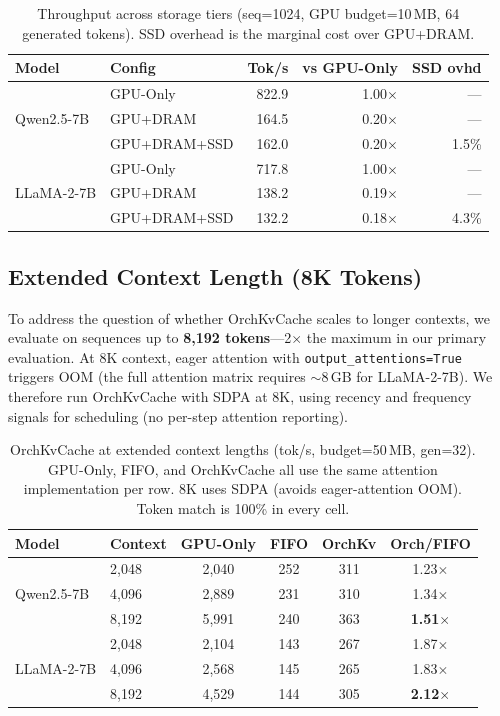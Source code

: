 \documentclass[conference]{IEEEtran}
\begin{document}
\begin{table}[t]
\centering
\caption{Throughput across storage tiers (seq=1024, GPU budget=10\,MB, 64 generated tokens). SSD overhead is the marginal cost over GPU+DRAM.}
\label{tab:tier-throughput}
\footnotesize
\setlength{\tabcolsep}{6pt}
\begin{tabular}{@{}llrrr@{}}
\toprule
Model & Config & Tok/s & vs GPU-Only & SSD ovhd \\
\midrule
\multirow{3}{*}{Qwen2.5-7B}
  & GPU-Only     & 822.9 & 1.00$\times$ & --- \\
  & GPU+DRAM     & 164.5 & 0.20$\times$ & --- \\
  & GPU+DRAM+SSD & 162.0 & 0.20$\times$ & 1.5\% \\
\midrule
\multirow{3}{*}{LLaMA-2-7B}
  & GPU-Only     & 717.8 & 1.00$\times$ & --- \\
  & GPU+DRAM     & 138.2 & 0.19$\times$ & --- \\
  & GPU+DRAM+SSD & 132.2 & 0.18$\times$ & 4.3\% \\
\bottomrule
\end{tabular}
\end{table}

\subsection{Extended Context Length (8K Tokens)}
\label{sec:scale}

To address the question of whether OrchKvCache scales to longer contexts, we evaluate on sequences up to \textbf{8{,}192 tokens}---2$\times$ the maximum in our primary evaluation. At 8K context, eager attention with \texttt{output\_attentions=True} triggers OOM (the full attention matrix requires ${\sim}$8\,GB for LLaMA-2-7B). We therefore run OrchKvCache with SDPA at 8K, using recency and frequency signals for scheduling (no per-step attention reporting).

\begin{table}[t]
\centering
\caption{OrchKvCache at extended context lengths (tok/s, budget=50\,MB, gen=32). GPU-Only, FIFO, and OrchKvCache all use the same attention implementation per row. 8K uses SDPA (avoids eager-attention OOM). Token match is 100\% in every cell.}
\label{tab:scale}
\small
\begin{tabular}{@{}llcccc@{}}
\toprule
Model & Context & GPU-Only & FIFO & OrchKv & Orch/FIFO \\
\midrule
\multirow{3}{*}{Qwen2.5-7B}
  & 2{,}048  & 2{,}040 & 252  & 311  & 1.23$\times$ \\
  & 4{,}096  & 2{,}889 & 231  & 310  & 1.34$\times$ \\
  & 8{,}192  & 5{,}991 & 240  & 363  & \textbf{1.51$\times$} \\
\midrule
\multirow{3}{*}{LLaMA-2-7B}
  & 2{,}048  & 2{,}104 & 143  & 267  & 1.87$\times$ \\
  & 4{,}096  & 2{,}568 & 145  & 265  & 1.83$\times$ \\
  & 8{,}192  & 4{,}529 & 144  & 305  & \textbf{2.12$\times$} \\
\bottomrule
\end{tabular}
\end{table}
\end{document}
